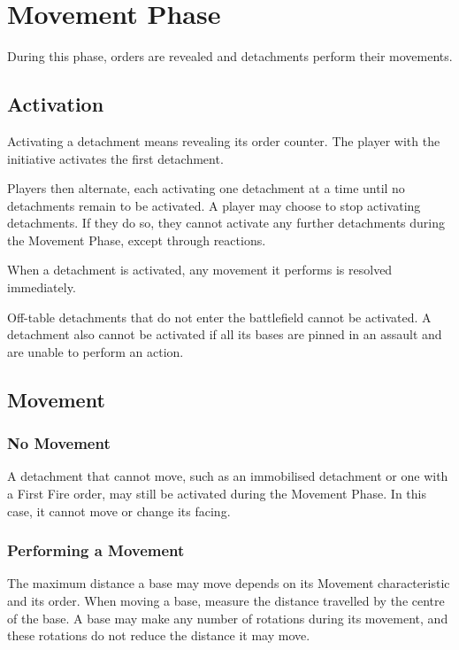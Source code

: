 \section{Movement Phase}
During this phase, orders are revealed and detachments perform their movements.

\subsection{Activation}

Activating a detachment means revealing its order counter. The player with the initiative activates the first detachment.

Players then alternate, each activating one detachment at a time until no detachments remain to be activated. A player may choose to stop activating detachments. If they do so, they cannot activate any further detachments during the Movement Phase, except through reactions.

When a detachment is activated, any movement it performs is resolved immediately.

Off-table detachments that do not enter the battlefield cannot be activated. A detachment also cannot be activated if all its bases are pinned in an assault and are unable to perform an action.

\subsection{Movement}

\subsubsection{No Movement}

A detachment that cannot move, such as an immobilised detachment or one with a First Fire order, may still be activated during the Movement Phase. In this case, it cannot move or change its facing.

\subsubsection{Performing a Movement}

The maximum distance a base may move depends on its Movement characteristic and its order. When moving a base, measure the distance travelled by the centre of the base. A base may make any number of rotations during its movement, and these rotations do not reduce the distance it may move.

